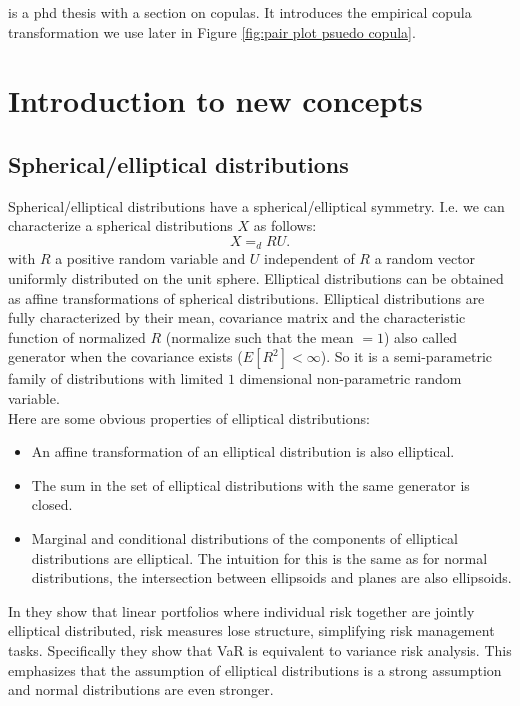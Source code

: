 \documentclass[a4paper,12pt]{article}
\begin{document}
\cite{lopez-paz_dependence_2016} is a phd thesis with a section on copulas. It introduces
the empirical copula transformation we use later in Figure \ref{fig:pair plot psuedo copula}. \\


\section{Introduction to new concepts}

\subsection{Spherical/elliptical distributions}
Spherical/elliptical distributions have a spherical/elliptical symmetry. I.e.
we can characterize a spherical distributions $X$ as follows:
\begin{equation}
    X =_{d} R U
    .
\end{equation}
with $R$ a positive random variable and $U$ independent of $R$ a random vector uniformly distributed on the unit sphere.
Elliptical distributions can be obtained as affine transformations of spherical distributions. Elliptical distributions
are fully characterized by their mean, covariance matrix and the characteristic function of normalized $R$
(normalize such that the mean $=1$) also called generator when the covariance exists ($E[R^{2}]<\infty$).
So it is a semi-parametric family of distributions with
limited $1$ dimensional non-parametric random variable.  \\

Here are some obvious properties of elliptical distributions:
\begin{itemize}
    \item An affine transformation of an elliptical distribution is also elliptical.
    \item The sum in the set of elliptical distributions with the same generator is closed.
    \item Marginal and conditional  distributions of the components of elliptical distributions are elliptical. The intuition
          for this is the same as for normal distributions, the intersection between ellipsoids and planes are also ellipsoids.
\end{itemize}

In \cite{dempster_correlation_2002} they show that linear portfolios where individual risk together are jointly elliptical
distributed, risk measures lose structure, simplifying risk management tasks. Specifically they show that VaR is equivalent
to variance risk analysis. This emphasizes that the assumption of elliptical distributions is a strong assumption and
normal distributions are even stronger.
\end{document}
